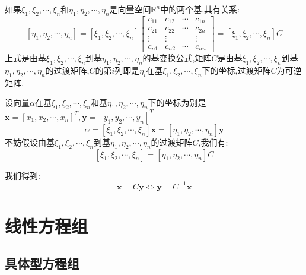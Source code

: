 \begin{definition}[基变换]
	如果$\xi_{1},\xi_{2},\cdots,\xi_{n}$和$\eta_{1},\eta_{2},\cdots,\eta_{n}$是向量空间$\mathbb{R}^{n}$中的两个基,其有关系:  
	$$[\eta_{1},\eta_{2},\cdots,\eta_{n}]=[\xi_{1},\xi_{2},\cdots,\xi_{n}]\left[ \begin{matrix}
		c_{11}&c_{12}&\cdots&c_{1n}\\
		c_{21}&c_{22}&\cdots&c_{2n}\\
		\vdots&\vdots& &\vdots\\
		c_{n1}&c_{n2}&\cdots&c_{nn}
	\end{matrix}\right]=[\xi_{1},\xi_{2},\cdots,\xi_{n}]C$$
	上式是由基$\xi_{1},\xi_{2},\cdots,\xi_{n}$到基$\eta_{1},\eta_{2},\cdots,\eta_{n}$的基变换公式,矩阵$C$是由基$\xi_{1},\xi_{2},\cdots,\xi_{n}$到基$\eta_{1},\eta_{2},\cdots,\eta_{n}$的过渡矩阵,$C$的第$i$列即是$\eta_{i}$在基$\xi_{1},\xi_{2},\cdots,\xi_{n}$下的坐标,过渡矩阵$C$为可逆矩阵.
\end{definition}
\begin{definition}[坐标变换]
	设向量$\alpha$在基$\xi_{1},\xi_{2},\cdots,\xi_{n}$和基$\eta_{1},\eta_{2},\cdots,\eta_{n}$下的坐标为别是$\textbf{x}=[x_{1},x_{2},\cdots,x_{n}]^{T},\textbf{y}=[y_{1},y_{2},\cdots,y_{n}]^{T}$
	$$\alpha=[\xi_{1},\xi_{2},\cdots,\xi_{n}]\textbf{x}=[\eta_{1},\eta_{2},\cdots,\eta_{n}]\textbf{y}$$
	不妨假设由基$\xi_{1},\xi_{2},\cdots,\xi_{n}$到基$\eta_{1},\eta_{2},\cdots,\eta_{n}$的过渡矩阵$C$,我们有:  
	$$[\xi_{1},\xi_{2},\cdots,\xi_{n}]=[\eta_{1},\eta_{2},\cdots,\eta_{n}]C$$
	
	我们得到:  
	$$\textbf{x}=C\textbf{y}\Leftrightarrow \textbf{y}=C^{-1}\textbf{x}$$
\end{definition}
\chapter{线性方程组}
\section{具体型方程组}
